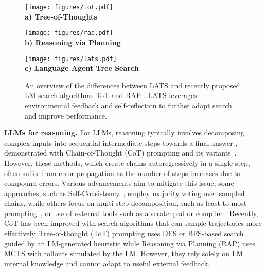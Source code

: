 \documentclass{article} \usepackage{iclr2024_conference,times}
\begin{document}
 
\begin{figure}[!htbp]
    \centering
    \begin{minipage}{0.32\textwidth}
        \centering
        \texttt{[image: figures/tot.pdf]}
        \vspace{-0.05in}
        \\\textbf{a) Tree-of-Thoughts}
        \label{fig:tot}
    \end{minipage}\hfill
    \hspace{-0.04\textwidth}
    \begin{minipage}{0.32\textwidth}
        \centering
        \texttt{[image: figures/rap.pdf]}
        \vspace{-0.05in}
        \\\textbf{b) Reasoning via Planning}
        \label{fig:rap}
    \end{minipage}\hfill
    \begin{minipage}{0.34\textwidth}
        \centering
        \texttt{[image: figures/lats.pdf]}
        \vspace{-0.05in}
        \\\textbf{c) Language Agent Tree Search}
        \label{fig:lats}
    \end{minipage}
    \vspace{-0.15in}
    \caption{An overview of the differences between LATS and recently proposed LM search algorithms ToT \citep{yao2023tree} and RAP \citep{hao2023reasoning}. LATS leverages environmental feedback and self-reflection to further adapt search and improve performance.}
    \vspace{-0.13in}
    \label{fig:comparison}
\end{figure}

\textbf{LLMs for reasoning.} For LLMs, reasoning typically involves decomposing complex inputs into sequential intermediate steps towards a final answer \citep{cobbe2021training}, demonstrated with Chain-of-Thought (CoT) prompting \citep{wei2022chain} and its variants~\citep{wei2022chain, kojima2022large, wang2022self}. However, these methods, which create chains autoregressively in a single step, often suffer from error propagation as the number of steps increases \citep{guo2018long,chen2022program} due to compound errors. Various advancements aim to mitigate this issue; some approaches, such as Self-Consistency~\citep{wang2022self}, employ majority voting over sampled chains, while others focus on multi-step decomposition, such as least-to-most prompting~\citep{zhou2022least}, or use of external tools such as a scratchpad \citep{nye2021show} or compiler \citep{gao2022pal}. Recently, CoT has been improved with search algorithms \citep{yao2023tree,hao2023reasoning,besta2023graph} that can sample trajectories more effectively. Tree-of-thought (ToT) prompting \citep{yao2023tree} uses DFS or BFS-based search guided by an LM-generated heuristic while Reasoning via Planning (RAP) \citep{hao2023reasoning} uses MCTS with rollouts simulated by the LM. However, they rely solely on LM internal knowledge and cannot adapt to useful external feedback.
\end{document}
